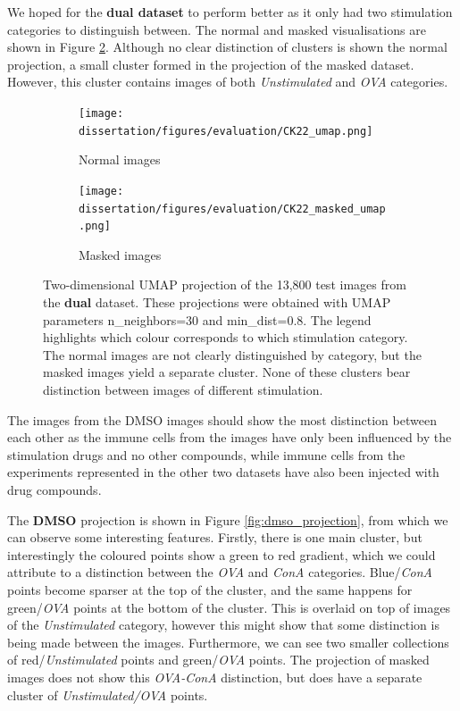 We hoped for the \textbf{dual dataset} to perform better as it only had two stimulation categories to distinguish between. The normal and masked visualisations are shown in Figure \ref{fig:dual_visualisation}. Although no clear distinction of clusters is shown the normal projection, a small cluster formed in the projection of the masked dataset. However, this cluster contains images of both \textit{Unstimulated} and \textit{OVA} categories.

\begin{figure}[ht!]
    \centering
    \begin{subfigure}[ht]{0.45\textwidth}
        \texttt{[image: dissertation/figures/evaluation/CK22\_umap.png]}
        \caption{Normal images}
    \end{subfigure}
    \begin{subfigure}[ht]{0.45\textwidth}
        \texttt{[image: dissertation/figures/evaluation/CK22\_masked\_umap.png]}
        \caption{Masked images}
        \label{subfig:dual_projection_masked}
    \end{subfigure}
    \caption{Two-dimensional UMAP projection of the 13,800 test images from the \textbf{dual} dataset. These projections were obtained with UMAP parameters n\_neighbors=30 and min\_dist=0.8. The legend highlights which colour corresponds to which stimulation category. The normal images are not clearly distinguished by category, but the masked images yield a separate cluster. None of these clusters bear distinction between images of different stimulation.}
    \label{fig:dual_visualisation}
\end{figure}

The images from the DMSO images should show the most distinction between each other as the immune cells from the images have only been influenced by the stimulation drugs and no other compounds, while immune cells from the experiments represented in the other two datasets have also been injected with drug compounds.

The \textbf{DMSO} projection is shown in Figure \ref{fig:dmso_projection}, from which we can observe some interesting features. Firstly, there is one main cluster, but interestingly the coloured points show a green to red gradient, which we could attribute to a distinction between the \textit{OVA} and \textit{ConA} categories. Blue/\textit{ConA} points become sparser at the top of the cluster, and the same happens for green/\textit{OVA} points at the bottom of the cluster. This is overlaid on top of images of the \textit{Unstimulated} category, however this might show that some distinction is being made between the images. Furthermore, we can see two smaller collections of red/\textit{Unstimulated} points and green/\textit{OVA} points. The projection of masked images does not show this \textit{OVA-ConA} distinction, but does have a separate cluster of \textit{Unstimulated/OVA} points.

